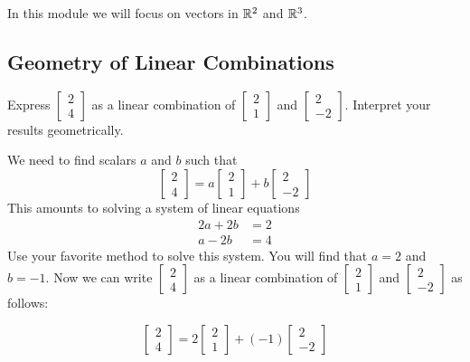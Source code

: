 \documentclass{ximera}
\begin{document}
In this module we will focus on vectors in $\mathbb{R}^2$ and $\mathbb{R}^3$.
\subsection*{Geometry of Linear Combinations}

\begin{example}
Express $\begin{bmatrix}2\\4\end{bmatrix}$ as a linear combination of $\begin{bmatrix}2\\1\end{bmatrix}$ and $\begin{bmatrix}2\\-2\end{bmatrix}$.  Interpret your results geometrically.
\begin{explanation}
We need to find scalars $a$ and $b$ such that 
$$\begin{bmatrix}2\\4\end{bmatrix}=a\begin{bmatrix}2\\1\end{bmatrix}+b\begin{bmatrix}2\\-2\end{bmatrix}$$
This amounts to solving a system of linear equations
\begin{align*}
2a+2b&=2\\
a-2b&=4
\end{align*}
Use your favorite method to solve this system.  You will find that $a=2$ and $b=-1$.  Now we can write $\begin{bmatrix}2\\4\end{bmatrix}$ as a linear combination of $\begin{bmatrix}2\\1\end{bmatrix}$ and $\begin{bmatrix}2\\-2\end{bmatrix}$ as follows:

$$\begin{bmatrix}2\\4\end{bmatrix}=2\begin{bmatrix}2\\1\end{bmatrix}+(-1)\begin{bmatrix}2\\-2\end{bmatrix}$$


\end{explanation}
\end{example}
\end{document}
